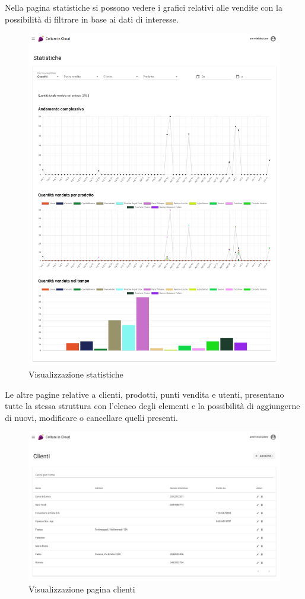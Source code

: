 \documentclass[italian]{report}
\begin{document}
Nella pagina statistiche si possono vedere i grafici relativi alle vendite con la possibilità di filtrare in base ai dati di interesse.
\begin{figure}[htp]
    \centering
    \includegraphics[width=\textwidth]{assets/final_stats.png}
    \caption{Visualizzazione statistiche}
    \label{fig:stats}
\end{figure}
\newpage
Le altre pagine relative a clienti, prodotti, punti vendita e utenti, presentano tutte la stessa struttura con l'elenco degli elementi e la possibilità di aggiungerne di nuovi, modificare o cancellare quelli presenti.
\begin{figure}[htp]
    \centering
    \includegraphics[width=\textwidth]{assets/final_customers.png}
    \caption{Visualizzazione pagina clienti}
    \label{fig:client_page}
\end{figure}
\end{document}
